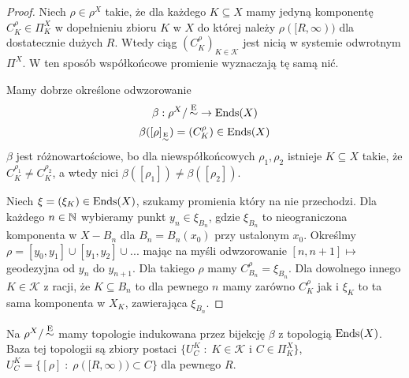 \begin{proof}
  Niech $\rho\in\rho^X$ takie, że dla każdego $K\subseteq X$ mamy jedyną komponentę $C_K^\rho\in\Pi_K^X$ w dopełnieniu zbioru $K$ w $X$ do której należy $\rho([R,\infty))$ dla dostatecznie dużych $R$. Wtedy ciąg $(C_K^\rho)_{K\in\mathcal{K}}$ jest nicią w systemie odwrotnym $\Pi^X$. W ten sposób współkońcowe promienie wyznaczają tę samą nić.

  Mamy dobrze określone odwzorowanie 
  $$\beta:\rho^X/\operatorname{\overset{E}{\sim}} \to \operatorname{Ends}(X)$$
  $$\beta([\rho]_{\operatorname{\overset{E}{\sim}}})=(C_K^{\rho})\in \operatorname{Ends}(X)$$
  $\beta$ jest różnowartościowe, bo dla niewspółkońcowych $\rho_1,\rho_2$ istnieje $K\subseteq X$ takie, że $C_K^{\rho_1}\neq C_K^{\rho_2}$, a wtedy nici $\beta([\rho_1])\neq \beta([\rho_2])$.

  Niech $\xi=(\xi_K)\in\operatorname{Ends}(X)$, szukamy promienia który na nie przechodzi. Dla każdego $n\in\mathbb{N}$ wybieramy punkt $y_n\in \xi_{B_n}$, gdzie $\xi_{B_n}$ to nieograniczona komponenta w $X-B_n$ dla $B_n=B_n(x_0)$ przy ustalonym $x_0$. Określmy $\rho=[y_0,y_1]\cup[y_1,y_2]\cup...$ mając na myśli odwzorowanie $[n, n+1]\mapsto$ geodezyjna od $y_n$ do $y_{n+1}$. Dla takiego $\rho$ mamy $C_{B_n}^\rho=\xi_{B_n}$. Dla dowolnego innego $K\in \mathcal{K}$ z racji, że $K\subseteq B_n$ to dla pewnego $n$ mamy zarówno $C_K^\rho$ jak i $\xi_K$ to ta sama komponenta w $X_K$, zawierająca $\xi_{B_n}$.
\end{proof}

Na $\rho^X/\operatorname{\overset{E}{\sim}}$ mamy topologie indukowana przez bijekcję $\beta$ z topologią $\operatorname{Ends}(X)$. Baza tej topologii są zbiory postaci $\{U_C^K\;:\;K\in\mathcal{K}$ i $C\in\Pi_K^X\}$, $U_C^K=\{[\rho]\;:\;\rho([R, \infty))\subset C\}$ dla pewnego $R$.

